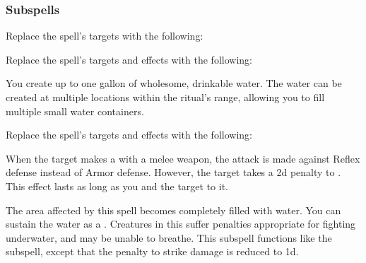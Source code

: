 \subsubsection{Subspells}
Replace the spell's targets with the following:
\begin{spellcontent}
\begin{augmenttargetinginfo}
\end{augmenttargetinginfo}
\end{spellcontent}
Replace the spell's targets and effects with the following:
\begin{spellcontent}
\begin{augmenttargetinginfo}
\end{augmenttargetinginfo}
\begin{augmenteffects}
\spelleffect
You create up to one gallon of wholesome, drinkable water.
The water can be created at multiple locations within the ritual's range, allowing you to fill multiple small water containers.
\end{augmenteffects}
\end{spellcontent}
Replace the spell's targets and effects with the following:
\begin{spellcontent}
\begin{augmenttargetinginfo}
\end{augmenttargetinginfo}
\begin{augmenteffects}
\spelleffect
When the target makes a  with a melee weapon, the attack is made against Reflex defense instead of Armor defense.
However, the target takes a \minus2d penalty to .
This effect lasts as long as you and the target  to it.
\end{augmenteffects}
\end{spellcontent}
The area affected by this spell becomes completely filled with water.
You can sustain the water as a .
Creatures in this  suffer penalties appropriate for fighting underwater, and may be unable to breathe.
This subspell functions like the  subspell, except that the penalty to strike damage is reduced to \minus1d.
